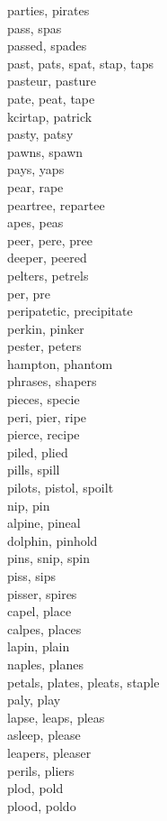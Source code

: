parties, pirates\\
pass, spas\\
passed, spades\\
past, pats, spat, stap, taps\\
pasteur, pasture\\
pate, peat, tape\\
kcirtap, patrick\\
pasty, patsy\\
pawns, spawn\\
pays, yaps\\
pear, rape\\
peartree, repartee\\
apes, peas\\
peer, pere, pree\\
deeper, peered\\
pelters, petrels\\
per, pre\\
peripatetic, precipitate\\
perkin, pinker\\
pester, peters\\
hampton, phantom\\
phrases, shapers\\
pieces, specie\\
peri, pier, ripe\\
pierce, recipe\\
piled, plied\\
pills, spill\\
pilots, pistol, spoilt\\
nip, pin\\
alpine, pineal\\
dolphin, pinhold\\
pins, snip, spin\\
piss, sips\\
pisser, spires\\
capel, place\\
calpes, places\\
lapin, plain\\
naples, planes\\
petals, plates, pleats, staple\\
paly, play\\
lapse, leaps, pleas\\
asleep, please\\
leapers, pleaser\\
perils, pliers\\
plod, pold\\
plood, poldo\\
